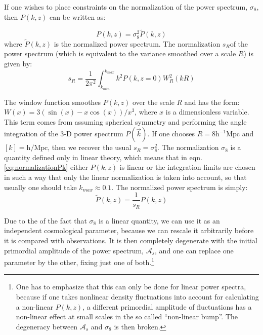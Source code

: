 If one wishes to place constraints on the normalization of the power
spectrum, $\sigma_{8}$, then $P(k,z)$ can be written as:

\begin{equation}
P(k,z)=\sigma_{8}^{2}\tilde{P}(k,z)\label{eq:normalizedPk}
\end{equation}
where $\tilde{P}(k,z)$ is the normalized power spectrum. The normalization
$s_{R}$of the power spectrum (which is equivalent to the variance
smoothed over a scale $R$) is given by:
\begin{equation}
s_{R}=\frac{1}{2\pi^{2}}\int_{k_{min}}^{k_{max}}k^{2}P(k,z=0)W_{R}^{2}(kR)\label{eq:normalizationPk}
\end{equation}


The window function smoothes $P(k,z)$ over the scale $R$ and has
the form: $W(x)=3(\sin(x)-x\cos(x))/x^{3}$, where $x$ is a dimensionless
variable. This term comes from assuming spherical symmetry and performing
the angle integration of the 3-D power spectrum $P(\vec{k})$. If
one chooses $R=8\mbox{h}^{-1}\mbox{Mpc}$ and $[k]=\mbox{h}/\mbox{Mpc}$,
then we recover the usual $s_{R}=\sigma_{8}^{2}$. The normalization
$\sigma_{8}$ is a quantity defined only in linear theory, which means
that in eqn. \ref{eq:normalizationPk} either $P(k,z)$ is linear
or the integration limits are chosen in such a way that only the linear
normalization is taken into account, so that usually one should take
$k_{max}\approx0.1$. The normalized power spectrum is simply: 
\begin{equation}
\tilde{P}(k,z)=\frac{1}{s_{R}}P(k,z)
\end{equation}


Due to the of the fact that $\sigma_{8}$ is a linear quantity, we
can use it as an independent cosmological parameter, because we can
rescale it arbitrarily before it is compared with observations. It
is then completely degenerate with the initial primordial amplitude
of the power spectrum, $\mathcal{A}_{s}$, and one can replace one
parameter by the other, fixing just one of both.\footnote{One has to emphasize that this can only be done for linear power spectra,
because if one takes nonlinear density fluctuations into account for
calculating a non-linear $P(k,z)$, a different primordial amplitude
of fluctuations has a non-linear effect at small scales in the so
called ``non-linear bump''. The degeneracy between $\mathcal{A}_{s}$
and $\sigma_{8}$ is then broken.}

